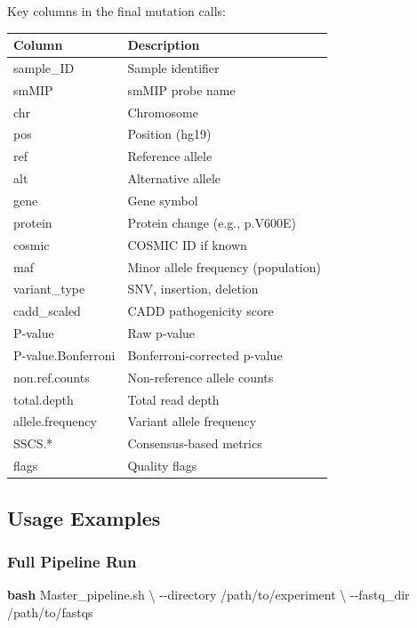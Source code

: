 \documentclass[
]{article}
\newenvironment{Shaded}{\begin{snugshade}}{\end{snugshade}}
\newcommand{\AttributeTok}[1]{\textcolor[rgb]{0.13,0.29,0.53}{#1}}
\newcommand{\DataTypeTok}[1]{\textcolor[rgb]{0.13,0.29,0.53}{#1}}
\newcommand{\FunctionTok}[1]{\textcolor[rgb]{0.13,0.29,0.53}{\textbf{#1}}}
\newcommand{\NormalTok}[1]{#1}
\newcounter{none} %
\begin{document}
Key columns in the final mutation calls:

{\def\LTcaptype{none} %
\begin{longtable}[]{@{}ll@{}}
\toprule\noalign{}
Column & Description \\
\midrule\noalign{}
\endhead
\bottomrule\noalign{}
\endlastfoot
sample\_ID & Sample identifier \\
smMIP & smMIP probe name \\
chr & Chromosome \\
pos & Position (hg19) \\
ref & Reference allele \\
alt & Alternative allele \\
gene & Gene symbol \\
protein & Protein change (e.g., p.V600E) \\
cosmic & COSMIC ID if known \\
maf & Minor allele frequency (population) \\
variant\_type & SNV, insertion, deletion \\
cadd\_scaled & CADD pathogenicity score \\
P-value & Raw p-value \\
P-value.Bonferroni & Bonferroni-corrected p-value \\
non.ref.counts & Non-reference allele counts \\
total.depth & Total read depth \\
allele.frequency & Variant allele frequency \\
SSCS.* & Consensus-based metrics \\
flags & Quality flags \\
\end{longtable}
}

\subsection{Usage Examples}\label{usage-examples}

\subsubsection{Full Pipeline Run}\label{full-pipeline-run}

\begin{Shaded}
\begin{Highlighting}[]
\FunctionTok{bash}\NormalTok{ Master\_pipeline.sh }\DataTypeTok{\textbackslash{}}
  \AttributeTok{{-}{-}directory}\NormalTok{ /path/to/experiment }\DataTypeTok{\textbackslash{}}
  \AttributeTok{{-}{-}fastq\_dir}\NormalTok{ /path/to/fastqs}
\end{Highlighting}
\end{Shaded}
\end{document}
